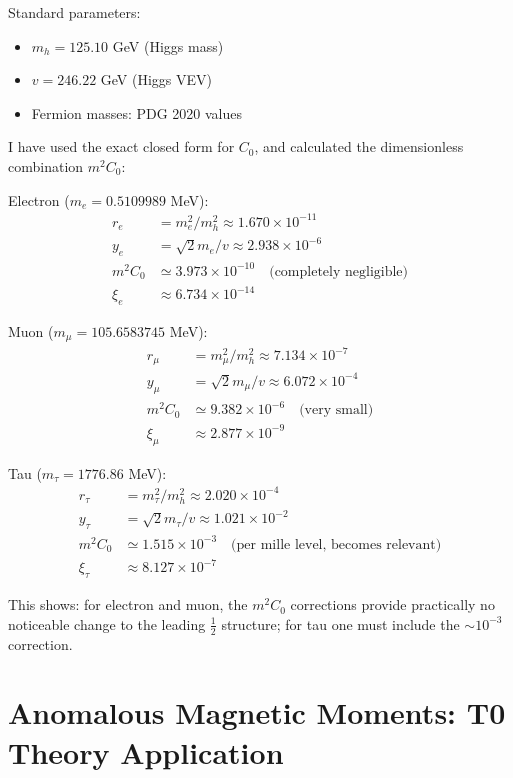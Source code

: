 \documentclass[12pt,a4paper]{article}
\theoremstyle{definition}
\begin{document}
	\begin{numerical}
		Standard parameters:
		\begin{itemize}
			\item $m_h = 125.10$ GeV (Higgs mass)
			\item $v = 246.22$ GeV (Higgs VEV)
			\item Fermion masses: PDG 2020 values
		\end{itemize}
		
		I have used the exact closed form for $C_0$, and calculated the dimensionless combination $m^2C_0$:
		
		Electron ($m_e = 0.5109989$ MeV):
		\begin{align}
			r_e &= m_e^2/m_h^2 \approx 1.670 \times 10^{-11}\\
			y_e &= \sqrt{2} m_e/v \approx 2.938 \times 10^{-6}\\
			m^2C_0 &\simeq 3.973 \times 10^{-10} \quad \text{(completely negligible)}\\
			\xi_e &\approx 6.734 \times 10^{-14}
		\end{align}
		
		Muon ($m_\mu = 105.6583745$ MeV):
		\begin{align}
			r_\mu &= m_\mu^2/m_h^2 \approx 7.134 \times 10^{-7}\\
			y_\mu &= \sqrt{2} m_\mu/v \approx 6.072 \times 10^{-4}\\
			m^2C_0 &\simeq 9.382 \times 10^{-6} \quad \text{(very small)}\\
			\xi_\mu &\approx 2.877 \times 10^{-9}
		\end{align}
		
		Tau ($m_\tau = 1776.86$ MeV):
		\begin{align}
			r_\tau &= m_\tau^2/m_h^2 \approx 2.020 \times 10^{-4}\\
			y_\tau &= \sqrt{2} m_\tau/v \approx 1.021 \times 10^{-2}\\
			m^2C_0 &\simeq 1.515 \times 10^{-3} \quad \text{(per mille level, becomes relevant)}\\
			\xi_\tau &\approx 8.127 \times 10^{-7}
		\end{align}
		
		This shows: for electron and muon, the $m^2C_0$ corrections provide practically no noticeable change to the leading $\frac{1}{2}$ structure; for tau one must include the $\sim 10^{-3}$ correction.
	\end{numerical}
	
	\section{Anomalous Magnetic Moments: T0 Theory Application}
	
\end{document}
